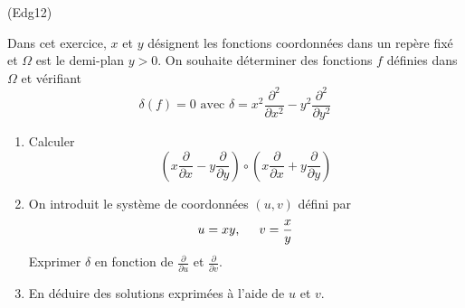 \begin{tiny}(Edg12)\end{tiny} Dans cet exercice, $x$ et $y$ désignent les fonctions coordonnées dans un repère fixé et $\Omega$ est le demi-plan $y>0$. On souhaite déterminer des fonctions $f$ définies dans $\Omega$ et vérifiant
\begin{displaymath}
 \delta(f)=0 \text{ avec } \delta = x^2\frac{\partial^2 }{\partial x^2}-y^2\frac{\partial^2 }{\partial y^2}
\end{displaymath}
\begin{enumerate}
 \item Calculer
\begin{displaymath}
 \left(x\frac{\partial}{\partial x}-y\frac{\partial}{\partial y} \right)
\circ
\left(x\frac{\partial}{\partial x}+y\frac{\partial}{\partial y} \right) 
\end{displaymath}
\item On introduit le système de coordonnées $(u,v)$ défini par
\begin{displaymath}
 u=xy,\hspace{0.5cm} v=\frac{x}{y}
\end{displaymath}
Exprimer $\delta$ en fonction de $\frac{\partial}{\partial u}$ et $\frac{\partial}{\partial v}$. 
\item En déduire des solutions exprimées à l'aide de $u$ et $v$.
\end{enumerate}
